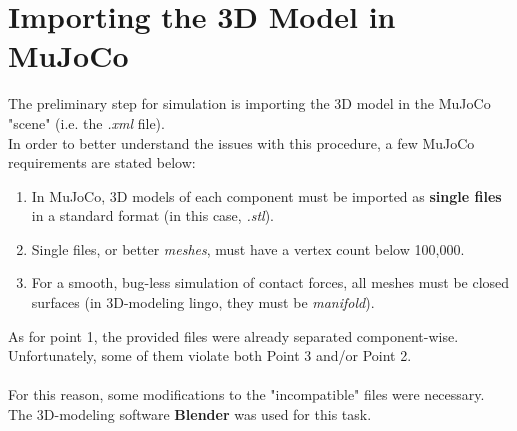 \documentclass[a4paper, 12pt]{article}
\begin{document}
 \section{Importing the 3D Model in MuJoCo}
 The preliminary step for simulation is importing the 3D model in the MuJoCo "scene" (i.e. the \textit{.xml} file).
 \\In order to better understand the issues with this procedure, a few MuJoCo requirements are stated below:
 \begin{enumerate}
     \item In MuJoCo, 3D models of each component must be imported as \textbf{single files} in a standard format (in this case, \textit{.stl}).
     \item Single files, or better \textit{meshes}, must have a vertex count below 100,000.
     \item For a smooth, bug-less simulation of contact forces, all meshes must be closed surfaces (in 3D-modeling lingo, they must be \textit{manifold}).
 \end{enumerate}
 As for point 1, the provided files were already separated component-wise. Unfortunately, some of them violate both Point 3 and/or Point 2.
 \\\\ For this reason, some modifications to the "incompatible" files were necessary. The 3D-modeling software \textbf{Blender} was used for this task.
\end{document}
